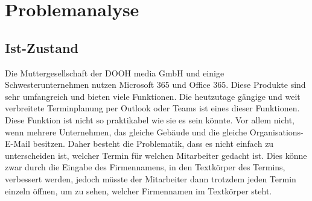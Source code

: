 


\pagebreak
\section{Problemanalyse}\label{sec:problemanalyse}
\subsection{Ist-Zustand}\label{subsec:ist-zustand}
Die Muttergesellschaft der DOOH media GmbH und einige Schwesterunternehmen nutzen Microsoft 365 und Office 365.
Diese Produkte sind sehr umfangreich und bieten viele Funktionen.
Die heutzutage gängige und weit verbreitete Terminplanung per Outlook oder Teams ist eines dieser Funktionen.
Diese Funktion ist nicht so praktikabel wie sie es sein könnte.
Vor allem nicht, wenn mehrere Unternehmen, das gleiche Gebäude und die gleiche Organisations-E-Mail besitzen.
Daher besteht die Problematik, dass es nicht einfach zu unterscheiden ist, welcher Termin für welchen Mitarbeiter gedacht ist.
Dies könne zwar durch die Eingabe des Firmennamens, in den Textkörper des Termins, verbessert werden, jedoch müsste der Mitarbeiter dann trotzdem jeden Termin einzeln öffnen, um zu sehen, welcher Firmennamen im Textkörper steht.
\newline
